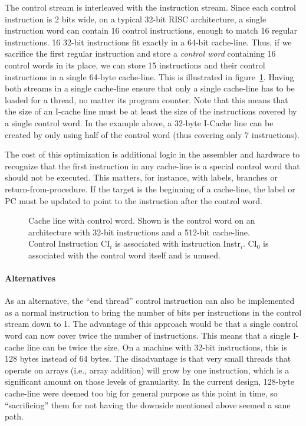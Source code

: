 The control stream is interleaved with the instruction stream. Since each control instruction is 2 bits wide, on a typical 32-bit RISC architecture, a single instruction word can contain 16 control instructions, enough to match 16 regular instructions. 16 32-bit instructions fit exactly in a 64-bit cache-line. Thus, if we sacrifice the first regular instruction and store a \emph{control word} containing 16 control words in its place, we can store 15 instructions and their control instructions in a single 64-byte cache-line. This is illustrated in figure~\ref{fig:control-word}. Having both streams in a single cache-line ensure that only a single cache-line has to be loaded for a thread, no matter its program counter. Note that this means that the size of an I-cache line must be at least the size of the instructions covered by a single control word. In the example above, a 32-byte I-Cache line can be created by only using half of the control word (thus covering only 7 instructions).

The cost of this optimization is additional logic in the assembler and hardware to recognize that the first instruction in any cache-line is a special control word that should not be executed. This matters, for instance, with labels, branches or return-from-procedure. If the target is the beginning of a cache-line, the label or PC must be updated to point to the instruction after the control word.

\begin{figure}
 \begin{center}
  
  \caption{Cache line with control word. Shown is the control word on an architecture with 32-bit instructions and a 512-bit cache-line. Control Instruction CI$_i$ is associated with instruction Instr$_i$. CI$_0$ is associated with the control word itself and is unused.}
  \label{fig:control-word}
 \end{center}
\end{figure}

\paragraph{Alternatives}

As an alternative, the ``end thread'' control instruction can also be implemented as a normal instruction to bring the number of bits per instructions in the control stream down to 1. The advantage of this approach would be that a single control word can now cover twice the number of instructions. This means that a single I-cache line can be twice the size. On a machine with 32-bit instructions, this is 128 bytes instead of 64 bytes. The disadvantage is that very small threads that operate on arrays (i.e., array addition) will grow by one instruction, which is a significant amount on those levels of granularity. In the current design, 128-byte cache-line were deemed too big for general purpose as this point in time, so ``sacrificing'' them for not having the downside mentioned above seemed a sane path.

